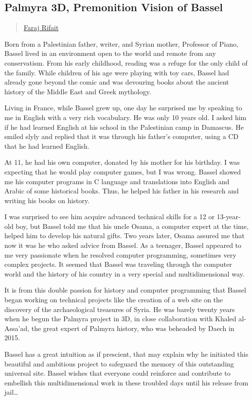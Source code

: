 \subsection{Palmyra 3D, Premonition Vision of
Bassel}\label{palmyra-3d-premonition-vision-of-bassel}

\begin{quote}
\hyperlink{faraj-rifait}{Faraj Rifait}
\end{quote}

Born from a Palestinian father, writer, and Syrian mother, Professor of
Piano, Bassel lived in an environment open to the world and remote from
any conservatism. From his early childhood, reading was a refuge for the
only child of the family. While children of his age were playing with
toy cars, Bassel had already gone beyond the comic and was devouring
books about the ancient history of the Middle East and Greek mythology.

Living in France, while Bassel grew up, one day he surprised me by
speaking to me in English with a very rich vocabulary. He was only 10
years old. I asked him if he had learned English at his school in the
Palestinian camp in Damascus. He smiled slyly and replied that it was
through his father's computer, using a CD that he had learned English.

At 11, he had his own computer, donated by his mother for his birthday.
I was expecting that he would play computer games, but I was wrong.
Bassel showed me his computer programs in C language and translations
into English and Arabic of some historical books. Thus, he helped his
father in his research and writing his books on history.

I was surprised to see him acquire advanced technical skills for a 12 or
13-year-old boy, but Bassel told me that his uncle Osama, a computer
expert at the time, helped him to develop his natural gifts. Two years
later, Osama assured me that now it was he who asked advice from Bassel.
As a teenager, Bassel appeared to me very passionate when he resolved
computer programming, sometimes very complex projects. It seemed that
Bassel was traveling through the computer world and the history of his
country in a very special and multidimensional way.

It is from this double passion for history and computer programming that
Bassel began working on technical projects like the creation of a web
site on the discovery of the archaeological treasures of Syria. He was
barely twenty years when he begun the Palmyra project in 3D, in close
collaboration with Khaled al-Assa'ad, the great expert of Palmyra
history, who was beheaded by Daech in 2015.

Bassel has a great intuition as if prescient, that may explain why he
initiated this beautiful and ambitious project to safeguard the memory
of this outstanding universal site. Bassel wishes that everyone could
reinforce and contribute to embellish this multidimensional work in
these troubled days until his release from jail\ldots{}

